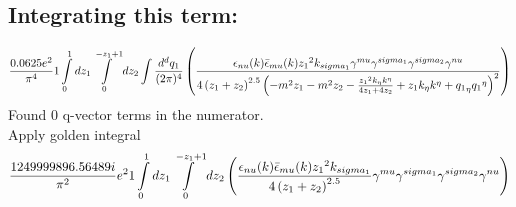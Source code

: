 \subsection*{Integrating this term:}
\begin{dmath}\frac{0.0625 e^{2}}{\pi^{4}}1\int\limits_{ 0 }^{ 1 } d{ z_{ 1 } }\int\limits_{ 0 }^{ - { z_{ 1 } } + 1 } d{ z_{ 2 } }\int\frac{d^d q_1 }{ (2\pi)^4 }\left(\frac{\epsilon_{ \\nu }({ k }) \bar{\epsilon}_{ \\mu }({ k }) { z_{ 1 } }^{2} { { k }_{ \\sigma_1 } } { \gamma^{ \\mu } } { \gamma^{ \\sigma_1 } } { \gamma^{ \\sigma_2 } } { \gamma^{ \\nu } }}{4 \left({ z_{ 1 } } + { z_{ 2 } }\right)^{2.5} \left(- m^{2} { z_{ 1 } } - m^{2} { z_{ 2 } } - \frac{{ z_{ 1 } }^{2} { { k }_{ \eta } } { { k }^{ \eta } }}{4 { z_{ 1 } } + 4 { z_{ 2 } }} + { z_{ 1 } } { { k }_{ \eta } } { { k }^{ \eta } } + { { q_1 }_{ \eta } } { { q_1 }^{ \eta } }\right)^{2}}\right)\end{dmath}
Found 0 q-vector terms in the numerator.\\
Apply golden integral
\begin{dmath}\frac{1249999896.56489 i}{\pi^{2}} e^{2}1\int\limits_{ 0 }^{ 1 } d{ z_{ 1 } }\int\limits_{ 0 }^{ - { z_{ 1 } } + 1 } d{ z_{ 2 } }\left(\frac{\epsilon_{ \\nu }({ k }) \bar{\epsilon}_{ \\mu }({ k }) { z_{ 1 } }^{2} { { k }_{ \\sigma_1 } }}{4 \left({ z_{ 1 } } + { z_{ 2 } }\right)^{2.5}} { \gamma^{ \\mu } } { \gamma^{ \\sigma_1 } } { \gamma^{ \\sigma_2 } } { \gamma^{ \\nu } }\right)\end{dmath}
